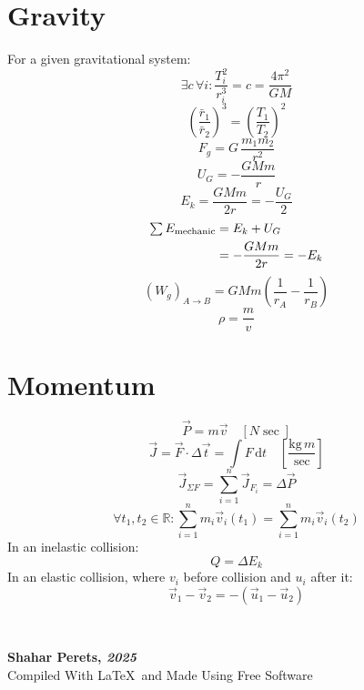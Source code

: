 \documentclass[]{article}
\newcommand\ndoc  {\dotfill \\ \vfil {\begin{center}
            {\textbf{Shahar Perets, \textit{2025}} \\
                \scriptsize {Compiled With \LaTeX \, and Made Using Free Software}}
    \end{center}} \vfil	}
\newcommand\R     {\mathbb{R}}
\newcommand\dt    {\,\mathrm{d}t}
\newcommand\Dg        {\Delta}
\newcommand\co        {\colon}
\newcommand\cl [1]    {\left ( #1 \right )}
\newcommand\csb[1]    {\left [ #1 \right ]}
\begin{document}
\begin{multicols}{3}
		\section{Gravity}
		For a given gravitational system: 
		\[ \exists c \, \forall i \co \frac{T_i^2}{r_i^3} = c = \frac{4\pi^2}{GM} \]
		\[ \cl{\frac{\bar r_1}{\bar r_2}} ^3= \cl{\frac{T_1}{T_2}}^2 \]
		\[ F_g = G \, \frac{m_1m_2}{r^2} \]
		\[ U_G = - \frac{G Mm}{r} \]
		\[ E_k = \frac{GMm}{2r} = - \frac{U_G}{2} \]
        \begin{align*}
            \textstyle \sum E_{\text{mechanic}} \displaystyle &= E_k + U_G \\
            &=  -\frac{GMm}{2r} = -E_k
        \end{align*}
        \[ (W_g)_{A \to B} = GMm\cl{\frac{1}{r_A} - \frac{1}{r_B}} \]
		\[ \rho = \frac{m}{v} \]
		
		\section{Momentum}
		\[ \vec P = m \vec v \quad \csb{N \sec} \]
		\[ \vec J = \vec F \cdot \Dg \vec t = \int F \dt \quad \csb{\frac{\mathrm{kg}\,m}{\sec}} \]
		\[ \vec J_{\Sigma F} = \sum_{i = 1}^{n}\vec J_{F_i} = \Dg \vec P \]
		\[ \forall t_1, t_2 \in \R \co \sum_{i = 1}^{n} m_i \vec v_i(t_1) = \sum_{i = 1}^{n}m_i \vec v_i(t_2) \]
		In an inelastic collision: 
		\[ Q = \Dg E_k \]
		In an elastic collision, where $v_i$ before collision and $u_i$ after it: 
		\[ \vec v_1 - \vec v_2 = -(\vec u_1 - \vec u_2) \]
	\end{multicols}
	\ndoc
	
\end{document}
